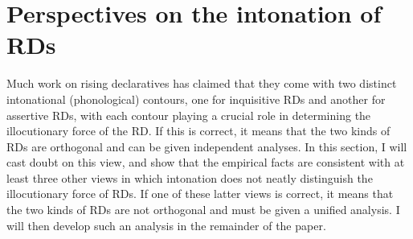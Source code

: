 \documentclass[output=paper,colorlinks,citecolor=brown]{langscibook}
\begin{document}
	
	
	
	
\section{Perspectives on the intonation of RDs} \label{noForm}
	
	
	
	Much work on rising declaratives has claimed that they come with two distinct intonational (phonological) contours, one for inquisitive RDs and another for assertive RDs, with each contour playing a crucial role in determining the illocutionary force of the RD. If this is correct, it means that the two kinds of RDs are orthogonal and can be given independent analyses. In this section, I will cast doubt on this view, and show that the empirical facts are consistent with at least three other views in which intonation does not neatly distinguish the illocutionary force of RDs.  If one of these latter views is correct, it means that the two kinds of RDs are not orthogonal and must be given a unified analysis. I will then develop such an analysis in the remainder of the paper.
	
\end{document}
